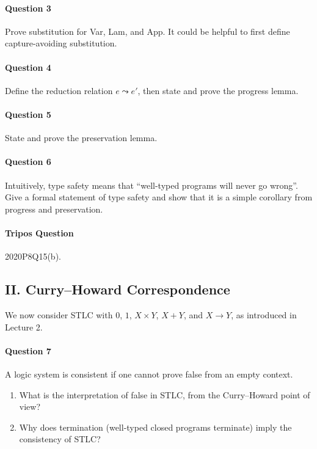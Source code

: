 \documentclass[11pt,a4paper,twoside]{article}
\begin{document}
\paragraph{Question 3} Prove substitution for Var, Lam, and App.
It could be helpful to first define capture-avoiding substitution.

\paragraph{Question 4} Define the reduction relation $e \leadsto e'$, then state and prove the progress lemma.

\paragraph{Question 5} State and prove the preservation lemma.

\paragraph{Question 6} Intuitively, type safety means that ``well-typed programs will never go wrong''. Give a formal statement of type safety and show that it is a simple corollary from progress and preservation.

\paragraph{Tripos Question} 2020P8Q15(b).

\subsection*{II. Curry--Howard Correspondence}

We now consider STLC with $0$, $1$, $X \times Y$, $X + Y$, and $X \to Y$, as introduced in Lecture 2.

\paragraph{Question 7} A logic system is consistent if one cannot prove false from an empty context. 
\begin{enumerate}[label=(\alph*)]
  \item What is the interpretation of false in STLC, from the Curry--Howard point of view? 
  \item Why does termination (well-typed closed programs terminate) imply the consistency of STLC?
\end{enumerate}
\end{document}
